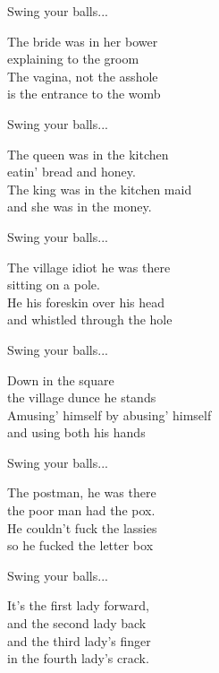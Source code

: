 Swing your balls...\par
\vspace{10pt}
The bride was in her bower\\
explaining to the groom\\
The vagina, not the asshole\\
is the entrance to the womb\par
\vspace{10pt}
Swing your balls...\par
\vspace{10pt}
The queen was in the kitchen\\
eatin' bread and honey.\\
The king was in the kitchen maid\\
and she was in the money.\par
\vspace{10pt}
Swing your balls...\par
\vspace{10pt}
The village idiot he was there\\
sitting on a pole.\\
He his foreskin over his head\\
and whistled through the hole\par
\vspace{10pt}
Swing your balls...\par
\vspace{10pt}
Down in the square\\
the village dunce he stands\\
Amusing' himself by abusing' himself\\
and using both his hands\par
\vspace{10pt}
Swing your balls...\par
\vspace{10pt}
The postman, he was there\\
the poor man had the pox.\\
He couldn't fuck the lassies\\
so he fucked the letter box\par
\vspace{10pt}
Swing your balls...\par
\vspace{10pt}
It's the first lady forward,\\
and the second lady back\\
and the third lady's finger\\
in the fourth lady's crack.\par
